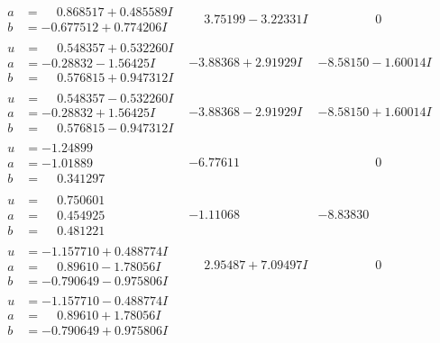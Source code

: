 \documentclass[1p]{elsarticle_modified}
\theoremstyle{definition}
\begin{document}
$$\begin{array}{c|c|c}
\begin{aligned}
a &= \phantom{-}0.868517 + 0.485589 I \\
b &= -0.677512 + 0.774206 I\end{aligned}
 & \phantom{-}3.75199 - 3.22331 I & \phantom{-0.000000 } 0 \\ \hline\begin{aligned}
u &= \phantom{-}0.548357 + 0.532260 I \\
a &= -0.28832 - 1.56425 I \\
b &= \phantom{-}0.576815 + 0.947312 I\end{aligned}
 & -3.88368 + 2.91929 I & -8.58150 - 1.60014 I \\ \hline\begin{aligned}
u &= \phantom{-}0.548357 - 0.532260 I \\
a &= -0.28832 + 1.56425 I \\
b &= \phantom{-}0.576815 - 0.947312 I\end{aligned}
 & -3.88368 - 2.91929 I & -8.58150 + 1.60014 I \\ \hline\begin{aligned}
u &= -1.24899\phantom{ +0.000000I} \\
a &= -1.01889\phantom{ +0.000000I} \\
b &= \phantom{-}0.341297\phantom{ +0.000000I}\end{aligned}
 & -6.77611\phantom{ +0.000000I} & \phantom{-0.000000 } 0 \\ \hline\begin{aligned}
u &= \phantom{-}0.750601\phantom{ +0.000000I} \\
a &= \phantom{-}0.454925\phantom{ +0.000000I} \\
b &= \phantom{-}0.481221\phantom{ +0.000000I}\end{aligned}
 & -1.11068\phantom{ +0.000000I} & -8.83830\phantom{ +0.000000I} \\ \hline\begin{aligned}
u &= -1.157710 + 0.488774 I \\
a &= \phantom{-}0.89610 - 1.78056 I \\
b &= -0.790649 - 0.975806 I\end{aligned}
 & \phantom{-}2.95487 + 7.09497 I & \phantom{-0.000000 } 0 \\ \hline\begin{aligned}
u &= -1.157710 - 0.488774 I \\
a &= \phantom{-}0.89610 + 1.78056 I \\
b &= -0.790649 + 0.975806 I\end{aligned}

\end{array}$$
\end{document}
